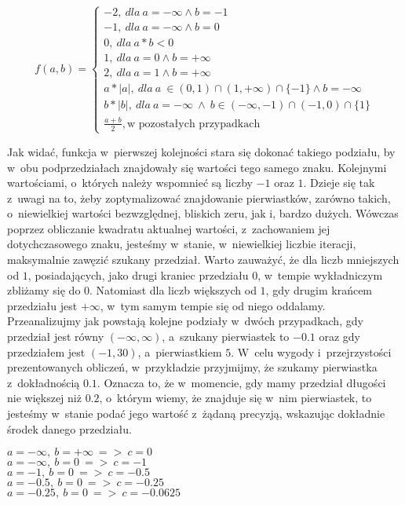 \[
f(a,b)=\left\{
\begin{array}{ll}
-2,\ dla\ a=-\infty \wedge b=-1\\
-1,\ dla\ a=-\infty \wedge b=0\\
0,\ dla\ a*b<0\\
1,\ dla\ a=0 \wedge b=+\infty\\
2,\ dla\ a=1 \wedge b=+\infty\\
a*|a|,\ dla\ a~\in (0,1) \cap (1,+\infty) \cap \{-1\} \wedge b=-\infty\ \\
b*|b|,\ dla\ a=-\infty\ \wedge \ b \in (-\infty,-1) \cap (-1,0) \cap \{1\}\\
\frac{a+b}{2},\text{w pozostałych przypadkach}
\end{array}
\right.
\]

Jak widać, funkcja w~pierwszej kolejności stara się dokonać takiego podziału, by w~obu podprzedziałach znajdowały się wartości tego samego znaku. Kolejnymi wartościami, o~których należy wspomnieć są liczby $-1$ oraz $1$. Dzieje się tak z~uwagi na to, żeby zoptymalizować znajdowanie pierwiastków, zarówno takich, o~niewielkiej wartości bezwzględnej, bliskich zeru, jak i, bardzo dużych. Wówczas poprzez obliczanie kwadratu aktualnej wartości, z~zachowaniem jej dotychczasowego znaku, jesteśmy w~stanie, w~niewielkiej liczbie iteracji, maksymalnie zawęzić szukany przedział. Warto zauważyć, że dla liczb mniejszych od $1$, posiadających, jako drugi kraniec przedziału $0$, w~tempie wykładniczym zbliżamy się do $0$. Natomiast dla liczb większych od $1$, gdy drugim krańcem przedziału jest $+\infty$, w~tym samym tempie się od niego oddalamy. Przeanalizujmy jak powstają kolejne podziały w~dwóch przypadkach, gdy przedział jest równy $(-\infty,\infty)$, a~szukany pierwiastek to $-0.1$ oraz gdy przedziałem jest $(-1,30)$, a~pierwiastkiem $5$. W~celu wygody i~przejrzystości prezentowanych obliczeń, w~przykładzie przyjmijmy, że szukamy pierwiastka z~dokładnością $0.1$. Oznacza to, że w~momencie, gdy mamy przedział długości nie większej niż $0.2$, o~którym wiemy, że znajduje się w~nim pierwiastek, to jesteśmy w~stanie podać jego wartość z~żądaną precyzją, wskazując dokładnie środek danego przedziału.

\begin{example}
	$ $ \\
	$a = -\infty,\ b = +\infty\ =>\ c=0$ \\
	$a = -\infty,\ b = 0\ =>\ c=-1$ \\
	$a = -1,\ b = 0\ =>\ c=-0.5$ \\
	$a = -0.5,\ b = 0\ =>\ c=-0.25$ \\
	$a = -0.25,\ b = 0\ =>\ c=-0.0625$
\end{example}


